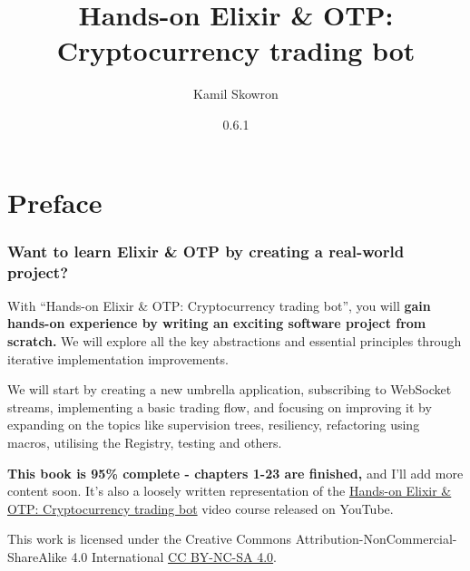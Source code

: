 \documentclass[
  oneside]{book}
\title{Hands-on Elixir \& OTP: Cryptocurrency trading bot}
\author{Kamil Skowron}
\date{0.6.1}
\let\oldmaketitle\maketitle
\begin{document}
\maketitle



\newpage

\let\maketitle\oldmaketitle
\maketitle

{
\setcounter{tocdepth}{1}
\tableofcontents
}
\chapter*{Preface}\label{preface}

\subsection*{Want to learn Elixir \& OTP by creating a real-world project?}\label{want-to-learn-elixir-otp-by-creating-a-real-world-project}

With ``Hands-on Elixir \& OTP: Cryptocurrency trading bot'', you will \textbf{gain hands-on experience by writing an exciting software project from scratch.} We will explore all the key abstractions and essential principles through iterative implementation improvements.

We will start by creating a new umbrella application, subscribing to WebSocket streams, implementing a basic trading flow, and focusing on improving it by expanding on the topics like supervision trees, resiliency, refactoring using macros, utilising the Registry, testing and others.

\textbf{This book is 95\% complete - chapters 1-23 are finished,} and I'll add more content soon. It's also a loosely written representation of the \href{https://www.youtube.com/watch?v=wVYIx7M6o28&list=PLxsE19GnjC5Nv1CbeKOiS5YqGqw35aZFJ}{Hands-on Elixir \& OTP: Cryptocurrency trading bot} video course released on YouTube.

This work is licensed under the Creative Commons Attribution-NonCommercial-ShareAlike 4.0 International \href{https://creativecommons.org/licenses/by-nc-sa/4.0/}{CC BY-NC-SA 4.0}.
\end{document}
